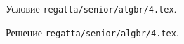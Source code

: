 \problem
Условие \texttt{regatta/senior/algbr/4.tex}.

\solution Решение \texttt{regatta/senior/algbr/4.tex}.
\endproblem
